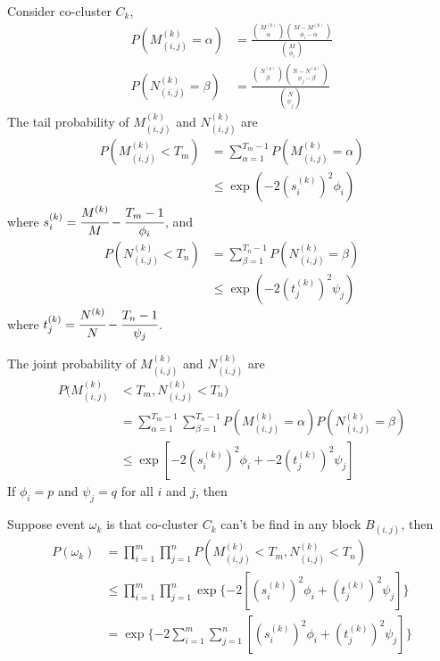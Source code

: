 Consider co-cluster $C_k$,
\begin{align*}
    P(M_{(i,j)}^{(k)} = \alpha) & = \frac{\binom{M^{(k)}}{\alpha} \binom{M-M^{(k)}}{\phi_i-\alpha}}{\binom{M}{\phi_i}} \\
    P(N_{(i,j)}^{(k)} = \beta)  & = \frac{\binom{N^{(k)}}{\beta} \binom{N-N^{(k)}}{\psi_j-\beta}}{\binom{N}{\psi_j}}
\end{align*}
The tail probability of $M_{(i,j)}^{(k)}$ and $N_{(i,j)}^{(k)}$ are
\begin{align*}
    P(M_{(i,j)}^{(k)} < T_m) & = \sum_{\alpha=1}^{T_m-1} P(M_{(i,j)}^{(k)} = \alpha) \\
                             & \le \exp(-2 (s_i^{(k)})^2 \phi_i)
\end{align*}
where $s_i^{(k)} = \cfrac{M^{(k)}}{M}-\cfrac{T_m-1}{\phi_i}$, and
\begin{align*}
    P(N_{(i,j)}^{(k)} < T_n) & = \sum_{\beta=1}^{T_n-1} P(N_{(i,j)}^{(k)} = \beta) \\
                             & \le \exp (-2 (t_j^{(k)})^2 \psi_j)
\end{align*}
where $t_j^{(k)} = \cfrac{N^{(k)}}{N}-\cfrac{T_n-1}{\psi_j}$.

The joint probability of $M_{(i,j)}^{(k)}$ and $N_{(i,j)}^{(k)}$ are
\begin{align*}
    P(M_{(i,j)}^{(k)} & < T_m, N_{(i,j)}^{(k)} < T_n)                               \\ & = \sum_{\alpha=1}^{T_m-1} \sum_{\beta=1}^{T_n-1} P(M_{(i,j)}^{(k)} = \alpha) P(N_{(i,j)}^{(k)} = \beta) \\
                      & \le \exp[-2 (s_i^{(k)})^2 \phi_i + -2 (t_j^{(k)})^2 \psi_j]
\end{align*}
If $\phi_i = p$ and $\psi_j = q$ for all $i$ and $j$, then

Suppose event $\omega_k$ is that co-cluster $C_k$ can't be find in any block $B_{(i,j)}$, then
\begin{align*}
    P(\omega_k) & = \prod_{i=1}^m \prod_{j=1}^n P(M_{(i,j)}^{(k)} < T_m, N_{(i,j)}^{(k)} < T_n)                          \\
                & \le \prod_{i=1}^m \prod_{j=1}^n \exp\{-2 \left[ (s_i^{(k)})^2 \phi_i + (t_j^{(k)})^2 \psi_j \right] \} \\
                & = \exp\{-2 \sum_{i=1}^m \sum_{j=1}^n \left[ (s_i^{(k)})^2 \phi_i + (t_j^{(k)})^2 \psi_j \right] \}     \\
\end{align*}

